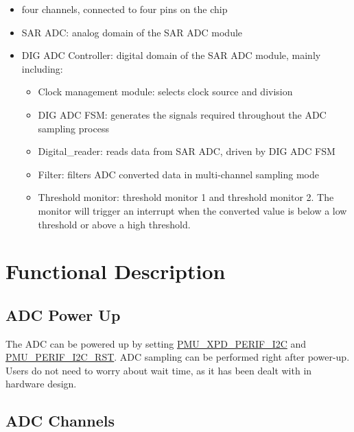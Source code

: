 \documentclass[main\_\_EN.tex]{subfiles}
\begin{document}
\begin{itemize}
    \item four channels, connected to four pins on the chip
    \item SAR ADC: analog domain of the SAR ADC module
    \item DIG ADC Controller: digital domain of the SAR ADC module, mainly including:
       \begin{itemize}
            \item Clock management module: selects clock source and division
            \item DIG ADC FSM: generates the signals required throughout the ADC sampling process
            \item Digital\_reader: reads data from SAR ADC, driven by DIG ADC FSM
            \item Filter: filters ADC converted data in multi-channel sampling mode
            \item Threshold monitor: threshold monitor 1 and threshold monitor 2. The monitor will trigger an interrupt when the converted value is below a low threshold or above a high threshold.
        \end{itemize}
\end{itemize}



\section{Functional Description}
\label{sec:sar-adc-func-descr}

\subsection{ADC Power Up}
\label{sec:sar-adc-power-up}

The ADC can be powered up by setting \hyperref[fielddesc:PMUXPDPERIFI2C]{PMU\_XPD\_PERIF\_I2C} and \hyperref[fielddesc:PMUPERIFI2CRST]{PMU\_PERIF\_I2C\_RST}. ADC sampling can be performed right after power-up. Users do not need to worry about wait time, as it has been dealt with in hardware design.

\subsection{ADC Channels}
\label{sec:sar-adc-channels}
\end{document}
